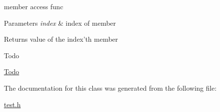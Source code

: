 member access func 


\begin{DoxyParams}{Parameters}
{\em index} & index of member \\
\hline
\end{DoxyParams}
\begin{DoxyReturn}{Returns}
value of the index'th member 
\end{DoxyReturn}
\begin{DoxyRefDesc}{Todo}
\item[\hyperlink{todo__todo000001}{Todo}]\end{DoxyRefDesc}


The documentation for this class was generated from the following file\+:\begin{DoxyCompactItemize}
\item 
\hyperlink{test_8h}{test.\+h}\end{DoxyCompactItemize}
